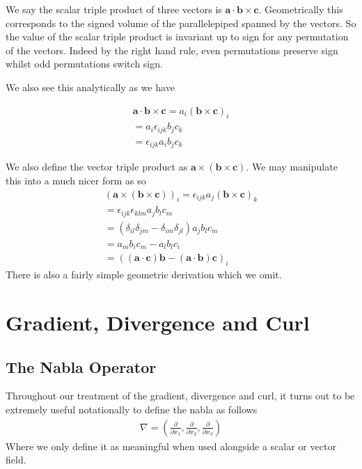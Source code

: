 \documentclass[]{article}
\begin{document}
We say the scalar triple product of three vectors is $\mathbf{a} \cdot \mathbf{b} \times \mathbf{c}$. Geometrically this corresponds to the signed volume of the parallelepiped spanned by the vectors. So the value of the scalar triple product is invariant up to sign for any permutation of the vectors. Indeed by the right hand rule, even permutations preserve sign whilst odd permutations switch sign.

We also see this analytically as we have

\begin{align*}
		\mathbf{a} \cdot \mathbf{b} \times \mathbf{c} = a_i (\mathbf{b} \times \mathbf{c})_i \\
		= a_i \epsilon_{ijk} b_j c_k \\
		= \epsilon_{ijk} a_i b_j c_k
\end{align*}

We also define the vector triple product as $\mathbf{a} \times (\mathbf{b} \times \mathbf{c})$. We may manipulate this into a much nicer form as so
\begin{align*}
		(\mathbf{a} \times (\mathbf{b} \times \mathbf{c}))_i = \epsilon_{ijk} a_j (\mathbf{b} \times \mathbf{c})_k \\
		= \epsilon_{ijk} \epsilon_{klm} a_j b_l c_m \\
		= (\delta_{il} \delta_{jm} - \delta_{im} \delta_{jl}) a_j b_l c_m \\
		= a_m b_i c_m - a_l b_l c_i \\
		= ((\mathbf{a} \cdot \mathbf{c}) \mathbf{b} - (\mathbf{a} \cdot \mathbf{b}) \mathbf{c})_i
\end{align*}
There is also a fairly simple geometric derivation which we omit.

\section{Gradient, Divergence and Curl}

\subsection{The Nabla Operator}

Throughout our treatment of the gradient, divergence and curl, it turns out to be extremely useful notationally to define the nabla as follows
\begin{align*}
		\nabla = \left(\frac{\partial}{\partial x_1}, \frac{\partial}{\partial x_2}, \frac{\partial}{\partial x_3} \right)
\end{align*}
Where we only define it as meaningful when used alongside a scalar or vector field.
\end{document}
